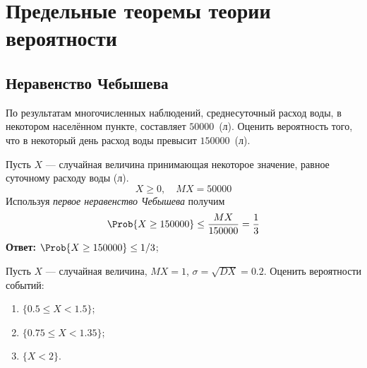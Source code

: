 
\section{Предельные теоремы теории вероятности}


\subsection{Неравенство Чебышева}

\begin{thm}
	
\end{thm}

\begin{thm}
	
\end{thm}

\begin{exm}
	По результатам многочисленных наблюдений, среднесуточный расход воды, в некотором населённом пункте, составляет $50000$~(л). Оценить вероятность того, что в некоторый день расход воды превысит $150000$~(л).
\end{exm}

\begin{slv}
	Пусть $X$ --- случайная величина принимающая некоторое значение, равное суточному расходу воды (л).
	\[
		X \geq 0, \quad MX = 50000
	\]
	Используя \textit{первое неравенство Чебышева} получим
	\[
		\Prob\{X \geq 150000\} \leq \frac{MX}{150000} = \frac{1}{3}
	\]
	\textbf{Ответ:} $\Prob\{X \geq 150000\} \leq 1/3$;
\end{slv}

\begin{exm}
	Пусть $X$ --- случайная величина, $MX = 1$, $\sigma = \sqrt{DX} = 0.2$. Оценить вероятности событий:
	\begin{enumerate}
		\item $\{ 0.5 \leq X < 1.5 \}$;
		\item $\{ 0.75 \leq X < 1.35 \}$;
		\item $\{ X < 2 \}$.	
	\end{enumerate}
\end{exm}

